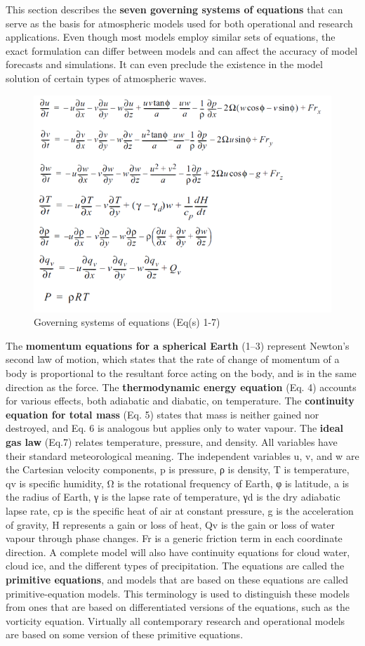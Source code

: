 \documentclass[12pt,oneside]{book}
\begin{document}
This section describes the \textbf{seven governing systems of equations}
that can serve as the basis for atmospheric models used for both
operational and research applications. Even though most models employ
similar sets of equations, the exact formulation can differ between
models and can affect the accuracy of model forecasts and simulations.
It can even preclude the existence in the model solution of certain
types of atmospheric waves.

\begin{figure}
\includegraphics[width=0.8\linewidth]{figures/Figure71} \caption{Governing systems of equations (Eq(s) 1-7)}\label{fig:GoverningSystemsofequations}
\end{figure}

The \textbf{momentum equations for a spherical Earth} (1--3) represent
Newton's second law of motion, which states that the rate of change of
momentum of a body is proportional to the resultant force acting on the
body, and is in the same direction as the force. The
\textbf{thermodynamic energy equation} (Eq. 4) accounts for various
effects, both adiabatic and diabatic, on temperature. The
\textbf{continuity equation for total mass} (Eq. 5) states that mass is
neither gained nor destroyed, and Eq. 6 is analogous but applies only to
water vapour. The \textbf{ideal gas law} (Eq.7) relates temperature,
pressure, and density. All variables have their standard meteorological
meaning. The independent variables u, v, and w are the Cartesian
velocity components, p is pressure, ρ is density, T is temperature, qv
is specific humidity, Ω is the rotational frequency of Earth, φ is
latitude, a is the radius of Earth, γ is the lapse rate of temperature,
γd is the dry adiabatic lapse rate, cp is the specific heat of air at
constant pressure, g is the acceleration of gravity, H represents a gain
or loss of heat, Qv is the gain or loss of water vapour through phase
changes. Fr is a generic friction term in each coordinate direction. A
complete model will also have continuity equations for cloud water,
cloud ice, and the different types of precipitation. The equations are
called the \textbf{primitive equations}, and models that are based on
these equations are called primitive-equation models. This terminology
is used to distinguish these models from ones that are based on
differentiated versions of the equations, such as the vorticity
equation. Virtually all contemporary research and operational models are
based on some version of these primitive equations.
\end{document}
